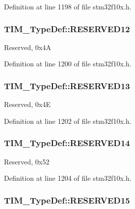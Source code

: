 Definition at line 1198 of file stm32f10x.\-h.

\hypertarget{struct_t_i_m___type_def_a994061b8b26ae9b2e8ddb981cb3eec11}{
\subsubsection[{R\-E\-S\-E\-R\-V\-E\-D12}]{ T\-I\-M\-\_\-\-Type\-Def\-::\-R\-E\-S\-E\-R\-V\-E\-D12}}\label{struct_t_i_m___type_def_a994061b8b26ae9b2e8ddb981cb3eec11}
Reserved, 0x4\-A 

Definition at line 1200 of file stm32f10x.\-h.

\hypertarget{struct_t_i_m___type_def_a5a831b0a42a5428fbbfd550b7a9c8108}{
\subsubsection[{R\-E\-S\-E\-R\-V\-E\-D13}]{ T\-I\-M\-\_\-\-Type\-Def\-::\-R\-E\-S\-E\-R\-V\-E\-D13}}\label{struct_t_i_m___type_def_a5a831b0a42a5428fbbfd550b7a9c8108}
Reserved, 0x4\-E 

Definition at line 1202 of file stm32f10x.\-h.

\hypertarget{struct_t_i_m___type_def_a548510ebbe395a3947dbbc49fcccec0d}{
\subsubsection[{R\-E\-S\-E\-R\-V\-E\-D14}]{ T\-I\-M\-\_\-\-Type\-Def\-::\-R\-E\-S\-E\-R\-V\-E\-D14}}\label{struct_t_i_m___type_def_a548510ebbe395a3947dbbc49fcccec0d}
Reserved, 0x52 

Definition at line 1204 of file stm32f10x.\-h.

\hypertarget{struct_t_i_m___type_def_af3eef319e095eadf480919b02c899dbd}{
\subsubsection[{R\-E\-S\-E\-R\-V\-E\-D15}]{ T\-I\-M\-\_\-\-Type\-Def\-::\-R\-E\-S\-E\-R\-V\-E\-D15}}\label{struct_t_i_m___type_def_af3eef319e095eadf480919b02c899dbd}


